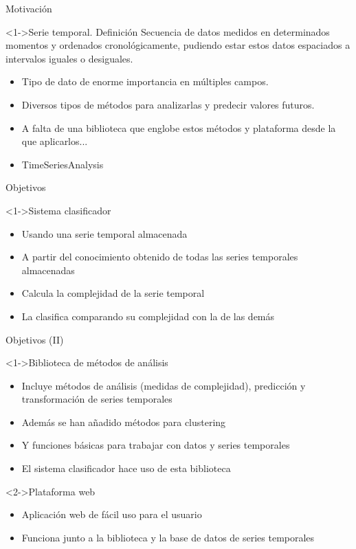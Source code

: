\titlepageframe %

\begin{tframe}{Motivación}
	\begin{block}<1->{Serie temporal. Definición}
		Secuencia de datos medidos en determinados momentos y ordenados cronológicamente, pudiendo estar estos datos espaciados a intervalos iguales o desiguales.
	\end{block}
	\begin{itemize}
		\item Tipo de dato de enorme importancia en múltiples campos.
		\item Diversos tipos de métodos para analizarlas y predecir valores futuros.
		\item<+-> A falta de una biblioteca que englobe estos métodos y plataforma desde la que aplicarlos...
		\item<+-| alert@+> TimeSeriesAnalysis
	\end{itemize}
\end{tframe}

\begin{tframe}{Objetivos}
	\begin{block}<1->{Sistema clasificador}
		\begin{itemize}
			\item Usando una serie temporal almacenada
			\item A partir del conocimiento obtenido de todas las series temporales almacenadas
			\item Calcula la complejidad de la serie temporal
			\item La clasifica comparando su complejidad con la de las demás
		\end{itemize}
	\end{block}
\end{tframe}

\begin{tframe}{Objetivos (II)}
	\begin{block}<1->{Biblioteca de métodos de análisis}
		\begin{itemize}
			\item Incluye métodos de análisis (medidas de complejidad), predicción y transformación de series temporales
			\item Además se han añadido métodos para clustering
			\item Y funciones básicas para trabajar con datos y series temporales
			\item El sistema clasificador hace uso de esta biblioteca
		\end{itemize}
	\end{block}
	\begin{block}<2->{Plataforma web}
		\begin{itemize}
			\item Aplicación web de fácil uso para el usuario
			\item Funciona junto a la biblioteca y la base de datos de series temporales
		\end{itemize}
	\end{block}
\end{tframe}

